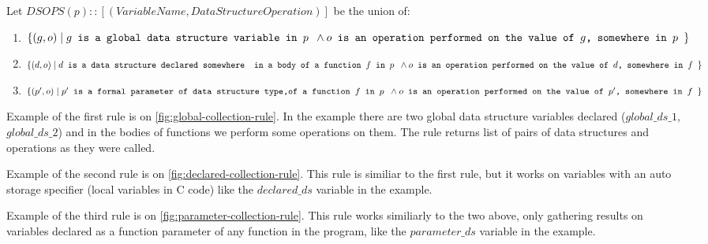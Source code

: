\documentclass[a4paper,11pt]{article}
\begin{document}
		Let $DSOPS(p) :: [(\mathit{VariableName}, \mathit{DataStructureOperation})]$ be the union of:
		\begin{enumerate}

			\item \label{it:global} $\{(g, o)\; |\; g \texttt{ is a global data structure variable in $p$ }
				\wedge \\ o \texttt{ is an operation performed on the value of $g$, somewhere in $p$ } \}$

			\item \label{it:auto} $\{(d, o)\; |\; d \texttt{ is a data structure declared somewhere } \\
				\texttt{ in a body of a function $f$ in $p$ } \wedge \\ o \texttt{ is an operation
				performed on the value of $d$, somewhere in $f$ } \}$

			\item \label{it:param} $\{(p', o)\; |\; p' \texttt{ is a formal parameter of data structure type,}
				\\ \texttt{of a function $f$ in $p$ } \wedge \\ o \texttt{ is an operation performed on the value of 
				$p'$, somewhere in $f$ } \}$

		\end{enumerate}

		Example of the first rule is on \autoref{fig:global-collection-rule}. In the example there are two global data structure variables declared ($global\_ds\_1$, $global\_ds\_2$) and in the bodies of functions we perform some operations on them. The rule returns list of pairs of data structures and operations as they were called.

		Example of the second rule is on \autoref{fig:declared-collection-rule}. This rule is similiar to the first rule, but it works on variables with an auto storage specifier (local variables in C code) like the $declared\_ds$ variable in the example.

		Example of the third rule is on \autoref{fig:parameter-collection-rule}. This rule works similiarly to the two above, only gathering results on variables declared as a function parameter of any function in the program, like the $parameter\_ds$ variable in the example.
\end{document}
